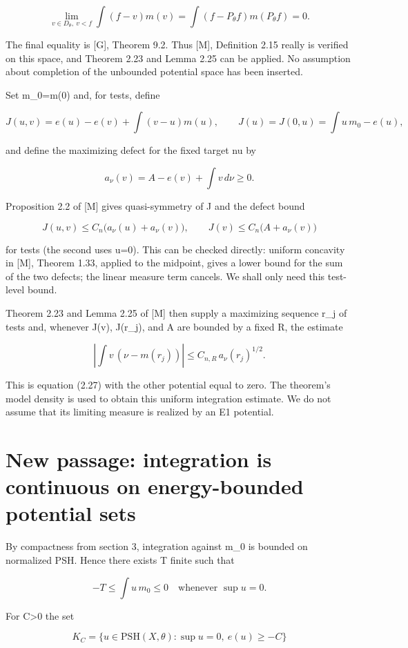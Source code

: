 \documentclass[11pt]{article}
\begin{document}
\[
\lim_{v\in D_\theta,\ v<f}\int(f-v)m(v)
=\int(f-P_\theta f)m(P_\theta f)=0.
\]

The final equality is [G], Theorem 9.2. Thus [M], Definition 2.15 really is verified on this space, and Theorem 2.23 and Lemma 2.25 can be applied. No assumption about completion of the unbounded potential space has been inserted.

Set m\_0=m(0) and, for tests, define

\[
J(u,v)=e(u)-e(v)+\int(v-u)m(u),\qquad
J(u)=J(0,u)=\int u\,m_0-e(u),
\]

and define the maximizing defect for the fixed target nu by

\[
a_\nu(v)=A-e(v)+\int v\,d\nu\geq0.
\]

Proposition 2.2 of [M] gives quasi-symmetry of J and the defect bound

\[
J(u,v)\leq C_n\bigl(a_\nu(u)+a_\nu(v)\bigr),\qquad
J(v)\leq C_n\bigl(A+a_\nu(v)\bigr)
\]

for tests (the second uses u=0). This can be checked directly: uniform concavity in [M], Theorem 1.33, applied to the midpoint, gives a lower bound for the sum of the two defects; the linear measure term cancels. We shall only need this test-level bound.

Theorem 2.23 and Lemma 2.25 of [M] then supply a maximizing sequence r\_j of tests and, whenever J(v), J(r\_j), and A are bounded by a fixed R, the estimate

\[
\left|\int v\,(\nu-m(r_j))\right|
\leq C_{n,R}\,a_\nu(r_j)^{1/2}.
\]

This is equation (2.27) with the other potential equal to zero. The theorem's model density is used to obtain this uniform integration estimate. We do not assume that its limiting measure is realized by an E1 potential.

\section{New passage: integration is continuous on energy-bounded potential sets}

By compactness from section 3, integration against m\_0 is bounded on normalized PSH. Hence there exists T finite such that

\[
-T\leq\int u\,m_0\leq0\quad\text{whenever }\sup u=0.
\]

For C\textgreater{}0 the set

\[
K_C=\{u\in\mathrm{PSH}(X,\theta):\sup u=0,\ e(u)\geq-C\}
\]
\end{document}
